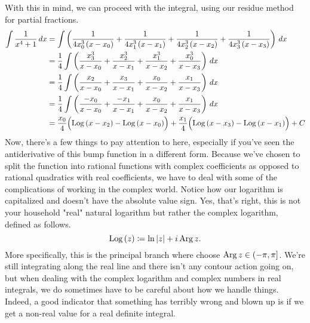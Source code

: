 With this in mind, we can proceed with the integral, using our residue method for partial fractions.
\begin{align*}
    \int \frac{1}{x^4 + 1} \, dx &= \int \left( \frac{1}{4x_0^3 \left( x - x_0 \right)} + \frac{1}{4x_1^3 \left( x - x_1 \right)} + \frac{1}{4x_2^3 \left( x - x_2 \right)} + \frac{1}{4x_3^3 \left( x - x_3 \right)} \right) \, dx \\
    &= \frac{1}{4} \int \left( \frac{x_3^3}{x - x_0} + \frac{x_2^3}{x - x_1} + \frac{x_1^3}{x - x_2} + \frac{x_0^3}{x - x_3} \right) \, dx \\
    &= \frac{1}{4} \int \left( \frac{x_2}{x - x_0} + \frac{x_3}{x - x_1} + \frac{x_0}{x - x_2} + \frac{x_1}{x - x_3} \right) \, dx \\
    &= \frac{1}{4} \int \left( \frac{-x_0}{x - x_0} + \frac{-x_1}{x - x_1} + \frac{x_0}{x - x_2} + \frac{x_1}{x - x_3} \right) \, dx \\
    &= \frac{x_0}{4} \Bigl( \operatorname{Log}{\left( x - x_2 \right)} - \operatorname{Log}{\left( x - x_0 \right)} \Bigr) + \frac{x_1}{4} \Bigl( \operatorname{Log}{\left( x - x_3 \right)} - \operatorname{Log}{\left( x - x_1 \right)} \Bigr) + C
\end{align*}
Now, there's a few things to pay attention to here, especially if you've seen
the antiderivative of this bump function in a different form.
 Because we've chosen to split the
function into rational functions with complex coefficients as opposed to
rational quadratics with real coefficients, we have to deal with some of the
complications of working in the complex world. Notice how our logarithm is
capitalized and doesn't have the absolute value sign. Yes, that's right, this
is not your household "real" natural logarithm but rather the complex
logarithm, defined as follows.
\[ \operatorname{Log}{\left( z \right)} \coloneqq \ln{\ensuremath{\left\lvert z \right\rvert}} + i\operatorname{Arg}{z} .\]
More specifically, this is the principal branch where choose \( \operatorname{Arg}{z} \in
\left( - \pi, \pi \right] \). We're still integrating along the real line and
there isn't any contour action going on, but when dealing with the complex
logarithm and complex numbers in real integrals, we do sometimes have to be
careful about how we handle things.  Indeed, a good indicator that
something has terribly wrong and blown up is if we get a non-real value for a
real definite integral.

